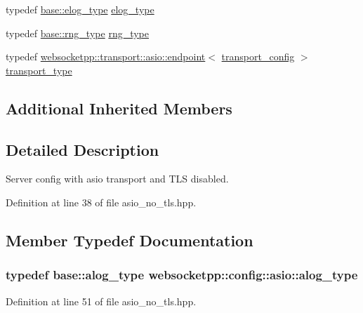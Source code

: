 \begin{DoxyCompactItemize}
typedef \hyperlink{structwebsocketpp_1_1config_1_1core_ac037ffb73b675a6251f3b86433b4eb17}{base\+::elog\+\_\+type} \hyperlink{structwebsocketpp_1_1config_1_1asio_a67f2a92d70443a37f25ffbc08a6a9c3d}{elog\+\_\+type}
\item 
typedef \hyperlink{structwebsocketpp_1_1config_1_1core_a245db33d05f7994d221db66f506ab8c6}{base\+::rng\+\_\+type} \hyperlink{structwebsocketpp_1_1config_1_1asio_afb20244eb1c988b20a5821ec04ac4f80}{rng\+\_\+type}
\item 
typedef \hyperlink{classwebsocketpp_1_1transport_1_1asio_1_1endpoint}{websocketpp\+::transport\+::asio\+::endpoint}$<$ \hyperlink{structwebsocketpp_1_1config_1_1asio_1_1transport__config}{transport\+\_\+config} $>$ \hyperlink{structwebsocketpp_1_1config_1_1asio_af600118e4ba565fa6e5063490e9e7047}{transport\+\_\+type}
\end{DoxyCompactItemize}
\subsection*{Additional Inherited Members}


\subsection{Detailed Description}
Server config with asio transport and T\+L\+S disabled. 

Definition at line 38 of file asio\+\_\+no\+\_\+tls.\+hpp.



\subsection{Member Typedef Documentation}
\hypertarget{structwebsocketpp_1_1config_1_1asio_a128280d7b2ff8256e10f23050a89549d}{}
\subsubsection[{alog\+\_\+type}]{\setlength{\rightskip}{0pt plus 5cm}typedef {\bf base\+::alog\+\_\+type} {\bf websocketpp\+::config\+::asio\+::alog\+\_\+type}}\label{structwebsocketpp_1_1config_1_1asio_a128280d7b2ff8256e10f23050a89549d}


Definition at line 51 of file asio\+\_\+no\+\_\+tls.\+hpp.

